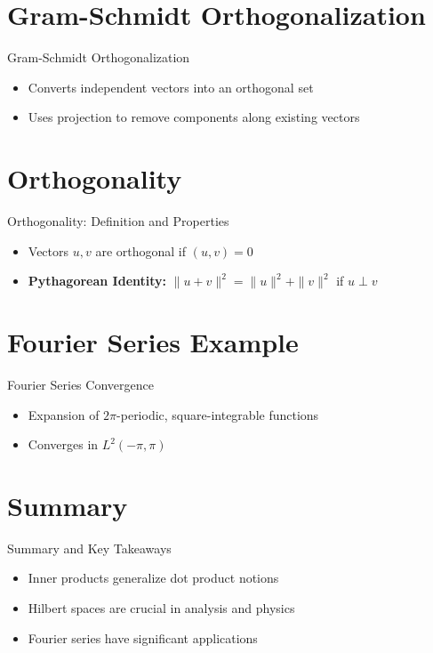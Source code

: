 \documentclass[
	aspectratio=169,    %
	onlytextwidth,        %
	t,                    %
]{beamer}
\begin{document}
\section{Gram-Schmidt Orthogonalization}
\begin{frame}{Gram-Schmidt Orthogonalization}
    \begin{itemize}
        \item Converts independent vectors into an orthogonal set
        \item Uses projection to remove components along existing vectors
    \end{itemize}
\end{frame}

\section{Orthogonality}
\begin{frame}{Orthogonality: Definition and Properties}
    \begin{itemize}
        \item Vectors $u, v$ are orthogonal if $(u,v) = 0$
        \item \textbf{Pythagorean Identity:} $\|u+v\|^2 = \|u\|^2 + \|v\|^2$ if $u \perp v$
    \end{itemize}
\end{frame}

\section{Fourier Series Example}
\begin{frame}{Fourier Series Convergence}
    \begin{itemize}
        \item Expansion of $2\pi$-periodic, square-integrable functions
        \item Converges in $L^2(-\pi,\pi)$
    \end{itemize}
\end{frame}

\section{Summary}
\begin{frame}{Summary and Key Takeaways}
    \begin{itemize}
        \item Inner products generalize dot product notions
        \item Hilbert spaces are crucial in analysis and physics
        \item Fourier series have significant applications
    \end{itemize}
\end{frame}

\appendix
\makethankyou
\end{document}
